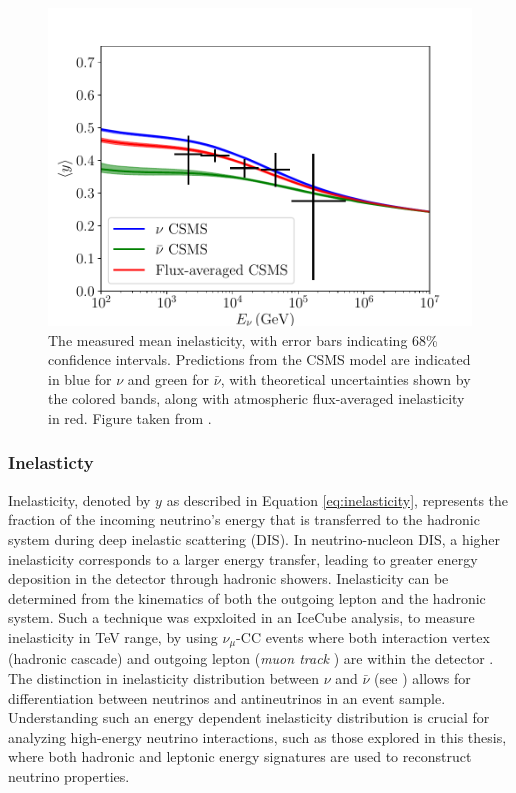\begin{figure}[h!]
        \includegraphics{./figures/nu_phenomenology/split_fit_inel.pdf}
        \caption{The measured mean inelasticity, with error bars indicating 68\% confidence intervals. Predictions from the CSMS model are indicated in blue for $\nu$ and green for $\bar{\nu}$, with theoretical uncertainties shown by the colored bands, along with atmospheric flux-averaged inelasticity in red. Figure taken from \cite{gary_paper}.}
    \end{figure}

\subsubsection*{Inelasticty}
\label{sec:inelasticity}

Inelasticity, denoted by $y$ as described in Equation \ref{eq:inelasticity}, represents the fraction of the incoming neutrino's energy that is transferred to the hadronic system during deep inelastic scattering (DIS). In neutrino-nucleon DIS, a higher inelasticity corresponds to a larger energy transfer, leading to greater energy deposition in the detector through hadronic showers. Inelasticity can be determined from the kinematics of both the outgoing lepton and the hadronic system. Such a technique was expxloited in an IceCube analysis, to measure inelasticity in TeV range, by using $\nu_{\mu}$-CC events where both interaction vertex (hadronic cascade) and outgoing lepton (\emph{muon track} ) are within the detector . The distinction in inelasticity distribution between $\nu$ and $\bar{\nu}$ (see ) allows for differentiation between neutrinos and antineutrinos in an event sample. Understanding such an energy dependent inelasticity distribution is crucial for analyzing high-energy neutrino interactions, such as those explored in this thesis, where both hadronic and leptonic energy signatures are used to reconstruct neutrino properties.  


